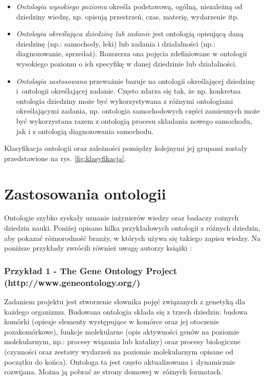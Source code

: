 \begin{itemize}
  \item \textit{Ontologia wysokiego poziomu }określa podstawową, ogólną, niezależną  od dziedziny wiedzę, np. opisują przestrzeń, czas, materię, wydarzenie  itp.
  \item \textit{Ontologia określająca dziedzinę lub zadanie }jest ontologią opisującą daną dziedzinę (np.: samochody, leki) lub zadania i działalności (np.: diagnozowanie, sprzedaż). 
Rozszerza ona pojęcia zdefiniowane w ontologii wysokiego poziomu o ich specyfikę w danej dziedzinie lub działalności. 
  \item \textit{Ontologia zastosowana} przeważnie bazuje na ontologii określającej dziedzinę i~ontologii określającej zadanie. Często zdarza się tak, że np. konkretna ontologia 
dziedziny może być wykorzystywana z różnymi ontologiami określającymi zadania, np. ontologia samochodowych części zamiennych może być wykorzystana razem  z ontologią
 procesu składania nowego samochodu, jak i z ontologią diagnozowania samochodu.
\end{itemize}

Klasyfikacja ontologii oraz zależności pomiędzy kolejnymi jej grupami zostały przedstawione na rys. \ref{fig:klasyfikacja}.

\section{Zastosowania ontologii}

Ontologie szybko zyskały uznanie inżynierów wiedzy oraz badaczy rożnych dziedzin nauki. Poniżej opisano kilka przykładowych ontologii z różnych dziedzin, aby pokazać 
różnorodność branży, w których używa się takiego zapisu wiedzy. Na poniższe przykłady zwrócili również uwagę autorzy książki \cite{ebook2}:

\subsubsection*{Przykład 1 - The Gene Ontology Project (http://www.geneontology.org/)}

Zadaniem projektu jest stworzenie słownika pojęć związanych z genetyką dla każdego organizmu. Budowana ontologia składa się z trzech dziedzin: budowa komórki 
(opisuje elementy występujące w komórce oraz jej otoczenie pozakomórkowe), funkcje molekularne (opis aktywności genów na poziomie molekularnym, np.: procesy wiązania 
lub katalizy) oraz procesy biologiczne (czynności oraz zestawy wydarzeń na poziomie molekularnym opisane od początku do końca). Ontologa ta jest często aktualizowana 
i~dynamicznie rozwijana. Można ją pobrać ze strony domowej w~różnych formatach. 


